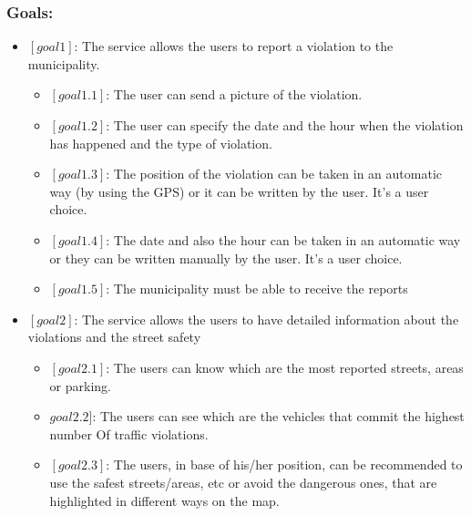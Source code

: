 \documentclass[titlepage]{article}
\begin{document}
\subsubsection{Goals:}
\begin{itemize}
\item $[goal 1]$:  The service allows the users to report a violation to the municipality.
\begin{itemize}

	\item $[goal 1.1]$: The user can send a picture of the 			violation.
	
	\item $[goal 1.2]$: The user can specify the date and the 						hour when the violation has happened 							and the type of violation.
	
	\item $[goal 1.3]$: The position of the violation can be 			                taken in an automatic way (by using 							the GPS) or it can be written by the 							user. It's a user choice.
	
	\item $[goal 1.4]$: The date and also the hour can be           		  taken in an automatic way or they can be written          		  manually by the user. It's a user choice.
	
	\item $[goal 1.5 ]$: The municipality must be able to     	receive the reports  \\
	
\end{itemize}

\item $[goal 2]$: The service allows the users to have detailed information about the violations and the street safety
      \begin{itemize}
      	\item $[goal 2.1]$: The users can know which are the 			most reported streets, areas or parking.
      	
      	\item $goal 2.2]$: The users can see which are the 				vehicles that commit the highest number
		Of traffic violations.
		
		\item $[goal 2.3]$: The users, in base of his/her 				position, can be recommended to use the safest 					streets/areas, etc or avoid the dangerous ones, that 			are highlighted in different ways on the map.\\


\end{itemize}
\end{itemize}
\end{document}
